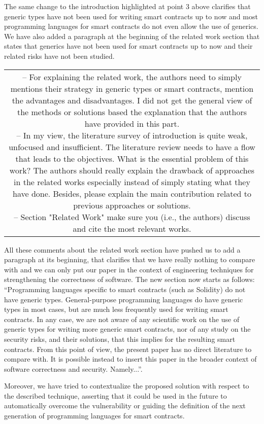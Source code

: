 \documentclass[journal,onecolumn, 11pt]{IEEEtran}
\newcommand{\BOX}[1]
{
  {\it
    \begin{center}
      \begin{tabular}{|c|}
        \hline
        \parbox{0.97\columnwidth}{
          \medskip
          #1
          \medskip} \\
        \hline
      \end{tabular}
    \end{center}
  }
}
\begin{document}
The same change to the introduction highlighted at point 3 above clarifies that generic types have not been used for writing smart contracts up to now and most programming
languages for smart contracts do not even allow the use of generics. We have also added a paragraph
at the beginning of the related work section that states that generics have not been used
for smart contracts up to now and their related risks have not been studied.

\BOX{6 -- For explaining the related work, the authors need to simply mentions their strategy in generic types or smart contracts, mention the advantages and disadvantages. I did not get the general view of the methods or solutions based the explanation that the authors have provided in this part. \\

\noindent 7 -- In my view, the literature survey of introduction is quite weak, unfocused and insufficient. The literature review needs to have a flow that leads to the objectives. What is the essential problem of this work? The authors should really explain the drawback of approaches in the related works especially instead of simply stating what they have done. Besides, please explain the main contribution related to previous approaches or solutions.\\

\noindent 8 -- Section "Related Work" make sure you (i.e., the authors) discuss and cite the most relevant works.}

All these comments about the related work section have pushed us to add a paragraph at its beginning, that clarifies that we have really nothing to compare with and we can only put our paper in the context of engineering techniques for strengthening the correctness of software. The new section now starts as follows: ``Programming languages specific to smart contracts (such as Solidity) do not have generic types. General-purpose programming languages do have generic types in most cases, but are much less frequently used for writing smart contracts. In any case, we are not aware of any scientific work on the use of generic types for writing more generic smart contracts, nor of any study on the security risks, and their solutions, that this implies for the resulting smart contracts. From this point of view, the present paper has no direct literature to compare with. It is possible instead to insert this paper in the broader context of software correctness and security. Namely...''.

Moreover, we have tried to contextualize the proposed solution with respect to the described technique, asserting that it could be used in the future to automatically overcome the vulnerability or guiding the definition of the next generation of programming languages for smart contracts.
\end{document}
